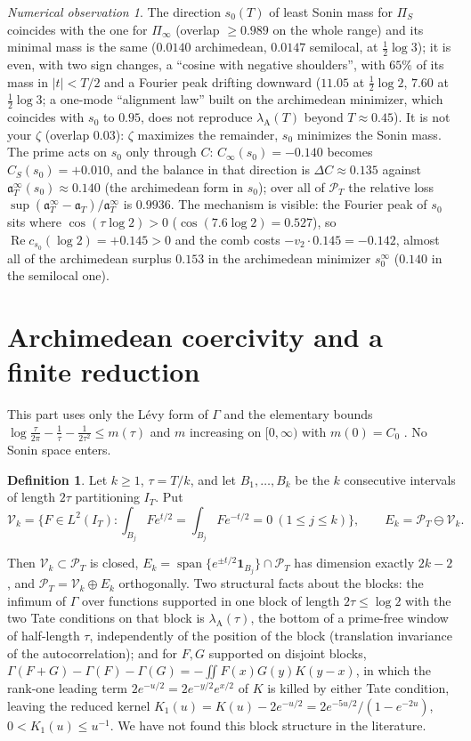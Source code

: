 \documentclass[11pt]{amsart}
\theoremstyle{definition}
\newtheorem{definition}[theorem]{Definition}
\theoremstyle{remark}
\newtheorem{observation}[theorem]{Numerical observation}
\newcommand{\Rel}{\operatorname{Re}}
\newcommand{\IT}{I_T}
\newcommand{\PT}{\mathcal P_T}
\newcommand{\lamA}{\lambda_{\mathrm A}}
\begin{document}
\begin{observation}\label{obs:s0}
The direction $s_0(T)$ of least Sonin mass for $\Pi_S$ coincides with the one for $\Pi_\infty$ (overlap $\ge0.989$ on the whole
range) and its minimal mass is the same ($0.0140$ archimedean, $0.0147$ semilocal, at $\frac12\log3$); it is even, with two sign
changes, a ``cosine with negative shoulders'', with $65\%$ of its mass in $|t|<T/2$ and a Fourier peak drifting downward
($11.05$ at $\frac12\log2$, $7.60$ at $\frac12\log3$; a one-mode ``alignment law'' built on the archimedean minimizer, which coincides with $s_0$ to $0.95$, does not reproduce $\lamA(T)$ beyond $T\approx0.45$). It is not your $\zeta$ (overlap $0.03$): $\zeta$ maximizes the
remainder, $s_0$ minimizes the Sonin mass. The prime acts on $s_0$ only through $C$: $C_\infty(s_0)=-0.140$ becomes
$C_S(s_0)=+0.010$, and the balance in that direction is $\Delta C\approx0.135$ against $\mathfrak a^\infty_T(s_0)\approx0.140$
(the archimedean form in $s_0$); over all of $\PT$ the relative loss $\sup(\mathfrak a^\infty_T-\mathfrak a_T)/\mathfrak a^\infty_T$ is
$0.9936$. The mechanism is visible: the Fourier peak of $s_0$ sits where $\cos(\tau\log2)>0$ ($\cos(7.6\log2)=0.527$), so
$\Rel c_{s_0}(\log2)=+0.145>0$ and the comb costs $-v_2\cdot0.145=-0.142$, almost all of the archimedean surplus $0.153$ in the archimedean minimizer $s_0^\infty$ ($0.140$ in the semilocal one).
\end{observation}

\section{Archimedean coercivity and a finite reduction}\label{sec:coer}

This part uses only the L\'evy form of $\Gamma$ and the elementary bounds
$\log\frac\tau{2\pi}-\frac1\tau-\frac1{2\tau^2}\le m(\tau)$ and $m$ increasing on $[0,\infty)$ with $m(0)=C_0$
\cite[elementary bounds on the symbol]{Paper47}. No Sonin space enters.

\begin{definition}
Let $k\ge1$, $\tau=T/k$, and let $B_1,\dots,B_k$ be the $k$ consecutive intervals of length $2\tau$ partitioning $\IT$. Put
\[
\mathcal V_k=\Big\{F\in L^2(\IT):\int_{B_j}Fe^{t/2}=\int_{B_j}Fe^{-t/2}=0\ (1\le j\le k)\Big\},\qquad E_k=\PT\ominus\mathcal V_k .
\]
\end{definition}
Then $\mathcal V_k\subset\PT$ is closed, $E_k=\operatorname{span}\{e^{\pm t/2}\mathbf 1_{B_j}\}\cap\PT$ has dimension exactly
$2k-2$, and $\PT=\mathcal V_k\oplus E_k$ orthogonally. Two structural facts about the blocks: the infimum of $\Gamma$ over
functions supported in one block of length $2\tau\le\log2$ with the two Tate conditions on that block is $\lamA(\tau)$, the bottom
of a prime-free window of half-length $\tau$, independently of the position of the block (translation invariance of the
autocorrelation); and for $F,G$ supported on disjoint blocks, $\Gamma(F+G)-\Gamma(F)-\Gamma(G)=-\iint F(x)G(y)K(y-x)$, in which
the rank-one leading term $2e^{-u/2}=2e^{-y/2}e^{x/2}$ of $K$ is killed by either Tate condition, leaving the reduced kernel
$K_1(u)=K(u)-2e^{-u/2}=2e^{-5u/2}/(1-e^{-2u})$, $0<K_1(u)\le u^{-1}$. We have not found this block structure in the literature.
\end{document}
